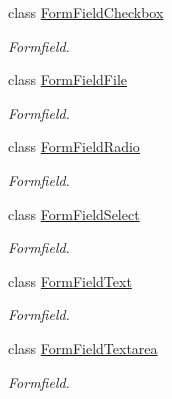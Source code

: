 \begin{DoxyCompactItemize}
class \hyperlink{classFormFieldCheckbox}{FormFieldCheckbox}
\begin{DoxyCompactList}\small\item\em Formfield. \item\end{DoxyCompactList}\item 
class \hyperlink{classFormFieldFile}{FormFieldFile}
\begin{DoxyCompactList}\small\item\em Formfield. \item\end{DoxyCompactList}\item 
class \hyperlink{classFormFieldRadio}{FormFieldRadio}
\begin{DoxyCompactList}\small\item\em Formfield. \item\end{DoxyCompactList}\item 
class \hyperlink{classFormFieldSelect}{FormFieldSelect}
\begin{DoxyCompactList}\small\item\em Formfield. \item\end{DoxyCompactList}\item 
class \hyperlink{classFormFieldText}{FormFieldText}
\begin{DoxyCompactList}\small\item\em Formfield. \item\end{DoxyCompactList}\item 
class \hyperlink{classFormFieldTextarea}{FormFieldTextarea}
\begin{DoxyCompactList}\small\item\em Formfield. \item\end{DoxyCompactList}\end{DoxyCompactItemize}
